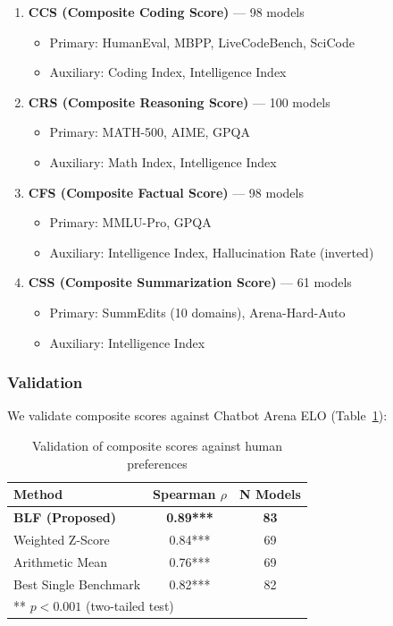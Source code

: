 \begin{enumerate}[nosep]
\item \textbf{CCS (Composite Coding Score)} --- 98 models
    \begin{itemize}[nosep]
    \item Primary: HumanEval, MBPP, LiveCodeBench, SciCode
    \item Auxiliary: Coding Index, Intelligence Index
    \end{itemize}

\item \textbf{CRS (Composite Reasoning Score)} --- 100 models
    \begin{itemize}[nosep]
    \item Primary: MATH-500, AIME, GPQA
    \item Auxiliary: Math Index, Intelligence Index
    \end{itemize}

\item \textbf{CFS (Composite Factual Score)} --- 98 models
    \begin{itemize}[nosep]
    \item Primary: MMLU-Pro, GPQA
    \item Auxiliary: Intelligence Index, Hallucination Rate (inverted)
    \end{itemize}

\item \textbf{CSS (Composite Summarization Score)} --- 61 models
    \begin{itemize}[nosep]
    \item Primary: SummEdits (10 domains), Arena-Hard-Auto
    \item Auxiliary: Intelligence Index
    \end{itemize}
\end{enumerate}

\subsubsection{Validation}

We validate composite scores against Chatbot Arena ELO (Table~\ref{tab:blf-validation}):

\begin{table}[t]
\centering
\caption{Validation of composite scores against human preferences}
\label{tab:blf-validation}
\small
\begin{tabular}{lcc}
\toprule
\textbf{Method} & \textbf{Spearman $\rho$} & \textbf{N Models} \\
\midrule
\textbf{BLF (Proposed)} & \textbf{0.89***} & \textbf{83} \\
Weighted Z-Score & 0.84*** & 69 \\
Arithmetic Mean & 0.76*** & 69 \\
Best Single Benchmark & 0.82*** & 82 \\
\bottomrule
\multicolumn{3}{l}{\footnotesize *** $p < 0.001$ (two-tailed test)}
\end{tabular}
\end{table}

